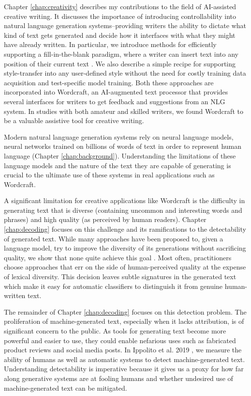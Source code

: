 Chapter \ref{chap:creativity} describes my contributions to the field of AI-assisted creative writing. 
It discusses the importance of introducing controllability into natural language generation systems--providing writers the ability to dictate what kind of text gets generated and decide how it interfaces with what they might have already written.
In particular, we introduce methods for efficiently supporting a fill-in-the-blank paradigm, where a writer can insert text into any position of their current text .
We also describe a simple recipe for supporting style-transfer into any user-defined style without the need for costly training data acquisition and test-specific model training.
Both these approaches are incorporated into Wordcraft, an AI-augmented text processor that provides several interfaces for writers to get feedback and suggestions from an NLG system.
In studies with both amateur and skilled writers, we found Wordcraft to be a valuable assistive tool for creative writing.

Modern natural language generation systems rely on neural language models, neural networks trained on billions of words of text in order to represent human language (Chapter \ref{chap:background}). 
Understanding the limitations of these language models and the nature of the text they are capable of generating is crucial to the ultimate use of these systems in real applications such as Wordcraft.

A significant limitation for creative applications like Wordcraft is the difficulty in generating text that is diverse (containing uncommon and interesting words and phrases) and high quality (as perceived by human readers).
Chapter \ref{chap:decoding} focuses on this challenge and its ramifications to the detectability of generated text.
While many approaches have been proposed to, given a language model, try to improve the diversity of its generations without sacrificing quality, we show that none quite achieve this goal \citep{ippolito2019comparison}.
Most often, practitioners choose approaches that err on the side of human-perceived quality at the expense of lexical diversity.
This decision leaves subtle signatures in the generated text which make it easy for automatic classifiers to distinguish it from genuine human-written text.

The remainder of Chapter \ref{chap:decoding} focuses on this detection problem.
The proliferation of machine-generated text, especially when it lacks attribution, is of significant concern to the public.
As tools for generating text become more powerful and easier to use, they could enable nefarious uses such as fabricated product reviews and social media posts.
In Ippolito et al. 2019 \citep{ippolito2020automatic}, we measure the ability of humans as well as automatic systems to detect machine-generated text.
Understanding detectability is imperative because it gives us a proxy for how far along generative systems are at fooling humans and whether undesired use of machine-generated text can be mitigated.

